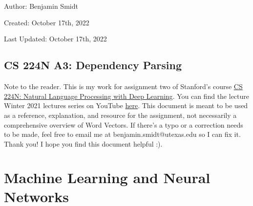 \documentclass[12pt]{article}
\begin{document}
\noindent Author: Benjamin Smidt

\noindent Created: October 17th, 2022

\noindent Last Updated: October 17th, 2022
\begin{center}
\section*{CS 224N A3: Dependency Parsing}
\end{center}

\paragraph{} Note to the reader. This is my work for assignment two of Stanford's course
\href{https://web.stanford.edu/class/cs224n/}{CS 224N: Natural Language Processing with Deep Learning}. 
You can find the lecture Winter 2021 lectures series on YouTube 
\href{https://www.youtube.com/playlist?list=PLoROMvodv4rOSH4v6133s9LFPRHjEmbmJ}{here}.
This document is meant to be used as a reference, explanation, and resource for the assignment, 
not necessarily a comprehensive overview of Word Vectors. If there's a typo or a correction 
needs to be made, feel free to email me at benjamin.smidt@utexas.edu so I can fix it. 
Thank you! I hope you find this document helpful :). 

\tableofcontents{}

\newpage

\section{Machine Learning and Neural Networks}
\end{document}
